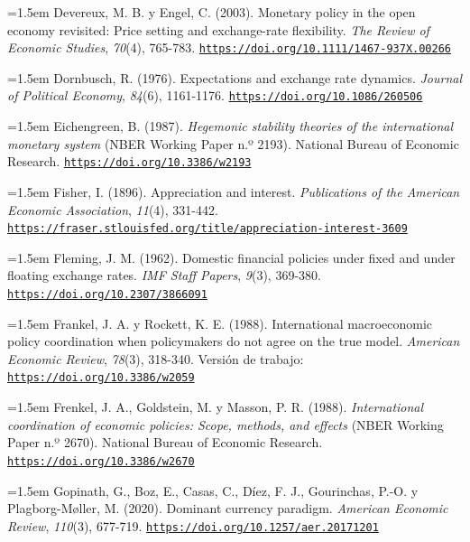 \documentclass[10pt,a4paper]{article}
\begin{document}
\noindent\hangindent=1.5em Devereux, M. B. y Engel, C. (2003). Monetary policy in the open economy revisited: Price setting and exchange-rate flexibility. \textit{The Review of Economic Studies}, \textit{70}(4), 765-783. \href{https://doi.org/10.1111/1467-937X.00266}{\nolinkurl{https://doi.org/10.1111/1467-937X.00266}}

\noindent\hangindent=1.5em Dornbusch, R. (1976). Expectations and exchange rate dynamics. \textit{Journal of Political Economy}, \textit{84}(6), 1161-1176. \href{https://doi.org/10.1086/260506}{\nolinkurl{https://doi.org/10.1086/260506}}

\noindent\hangindent=1.5em Eichengreen, B. (1987). \textit{Hegemonic stability theories of the international monetary system} (NBER Working Paper n.º 2193). National Bureau of Economic Research. \href{https://doi.org/10.3386/w2193}{\nolinkurl{https://doi.org/10.3386/w2193}}

\noindent\hangindent=1.5em Fisher, I. (1896). Appreciation and interest. \textit{Publications of the American Economic Association}, \textit{11}(4), 331-442. \href{https://fraser.stlouisfed.org/title/appreciation-interest-3609}{\nolinkurl{https://fraser.stlouisfed.org/title/appreciation-interest-3609}}

\noindent\hangindent=1.5em Fleming, J. M. (1962). Domestic financial policies under fixed and under floating exchange rates. \textit{IMF Staff Papers}, \textit{9}(3), 369-380. \href{https://doi.org/10.2307/3866091}{\nolinkurl{https://doi.org/10.2307/3866091}}

\noindent\hangindent=1.5em Frankel, J. A. y Rockett, K. E. (1988). International macroeconomic policy coordination when policymakers do not agree on the true model. \textit{American Economic Review}, \textit{78}(3), 318-340. Versión de trabajo: \href{https://doi.org/10.3386/w2059}{\nolinkurl{https://doi.org/10.3386/w2059}}

\noindent\hangindent=1.5em Frenkel, J. A., Goldstein, M. y Masson, P. R. (1988). \textit{International coordination of economic policies: Scope, methods, and effects} (NBER Working Paper n.º 2670). National Bureau of Economic Research. \href{https://doi.org/10.3386/w2670}{\nolinkurl{https://doi.org/10.3386/w2670}}

\noindent\hangindent=1.5em Gopinath, G., Boz, E., Casas, C., Díez, F. J., Gourinchas, P.-O. y Plagborg-M\o ller, M. (2020). Dominant currency paradigm. \textit{American Economic Review}, \textit{110}(3), 677-719. \href{https://doi.org/10.1257/aer.20171201}{\nolinkurl{https://doi.org/10.1257/aer.20171201}}
\end{document}
